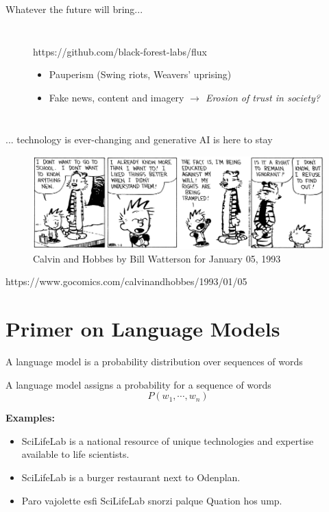 \documentclass[10pt]{beamer}
\newcommand{\credit}[1]{{\par \raggedleft \scriptsize \mdseries \color{mDarkBrown} #1 \par}}
\newcommand{\creditdark}[1]{{\par \raggedleft \scriptsize \mdseries \color{scMGray} #1 \par}}
\begin{document}
\begin{frame}[standout]{Whatever the future will bring...}
\begin{columns}[T,onlytextwidth]
\begin{figure}
			\creditdark{https://github.com/black-forest-labs/flux}
				\begin{itemize}
				\item Pauperism (Swing riots, Weavers' uprising)
				\item Fake news, content and imagery\vspace{0.5cm} \linebreak 
						\emph{$\rightarrow$ Erosion of trust in society?}
			\end{itemize}
		\end{figure}
	\end{columns}
\end{frame}


\begin{frame}{... technology is ever-changing and generative AI is here to stay}
\begin{figure}
	\includegraphics[width=\textwidth]{figures/IgnorantCalvin.jpg}
	\caption{Calvin and Hobbes by Bill Watterson for January 05, 1993}
\end{figure}
\credit{https://www.gocomics.com/calvinandhobbes/1993/01/05}
\end{frame}


\section{Primer on Language Models}



\begin{frame}{A language model is a probability distribution over sequences of words}
		\begin{exampleblock}{A language model}
			assigns a probability for a sequence of words
			$$
			P(w_1, \cdots, w_{n})
			$$
		\end{exampleblock}
		\textbf{Examples:}
			\begin{itemize}
				\item SciLifeLab is a national resource of unique technologies and expertise available to life scientists.
				\item SciLifeLab is a burger restaurant next to Odenplan.
				\item Paro vajolette esfi SciLifeLab snorzi palque Quation hos ump.
			\end{itemize}
\end{frame}
\end{document}
